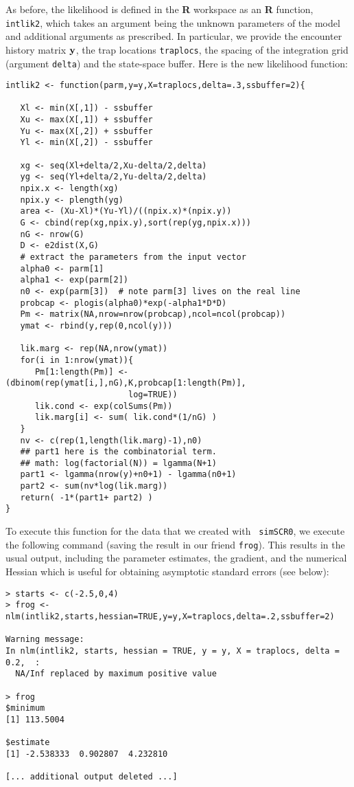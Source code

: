 As before, the likelihood is defined in the {\bf R} workspace as an
{\bf R} function, \mbox{\tt intlik2}, which takes an argument being
the unknown parameters of the model and additional arguments as
prescribed. In particular, we provide the encounter history matrix
${\bf y}$, the trap locations \mbox{\tt traplocs}, the spacing of the
integration grid (argument \mbox{\tt delta}) and the state-space
buffer. Here is the new likelihood function: {\small
\begin{verbatim}
intlik2 <- function(parm,y=y,X=traplocs,delta=.3,ssbuffer=2){

   Xl <- min(X[,1]) - ssbuffer
   Xu <- max(X[,1]) + ssbuffer
   Yu <- max(X[,2]) + ssbuffer
   Yl <- min(X[,2]) - ssbuffer

   xg <- seq(Xl+delta/2,Xu-delta/2,delta) 
   yg <- seq(Yl+delta/2,Yu-delta/2,delta) 
   npix.x <- length(xg)
   npix.y <- plength(yg)
   area <- (Xu-Xl)*(Yu-Yl)/((npix.x)*(npix.y))
   G <- cbind(rep(xg,npix.y),sort(rep(yg,npix.x)))
   nG <- nrow(G)
   D <- e2dist(X,G) 
   # extract the parameters from the input vector
   alpha0 <- parm[1]
   alpha1 <- exp(parm[2])
   n0 <- exp(parm[3])  # note parm[3] lives on the real line
   probcap <- plogis(alpha0)*exp(-alpha1*D*D)
   Pm <- matrix(NA,nrow=nrow(probcap),ncol=ncol(probcap))
   ymat <- rbind(y,rep(0,ncol(y)))

   lik.marg <- rep(NA,nrow(ymat))
   for(i in 1:nrow(ymat)){
      Pm[1:length(Pm)] <- (dbinom(rep(ymat[i,],nG),K,probcap[1:length(Pm)],
                         log=TRUE))
      lik.cond <- exp(colSums(Pm))
      lik.marg[i] <- sum( lik.cond*(1/nG) )  
   }                                                 
   nv <- c(rep(1,length(lik.marg)-1),n0)
   ## part1 here is the combinatorial term. 
   ## math: log(factorial(N)) = lgamma(N+1)
   part1 <- lgamma(nrow(y)+n0+1) - lgamma(n0+1)
   part2 <- sum(nv*log(lik.marg))
   return( -1*(part1+ part2) )
}
\end{verbatim}
} 
To execute this function for the data that we created with \mbox{\tt
  simSCR0}, we execute the following command (saving the result in our
friend \mbox{\tt frog}).  This results in the usual output, including
the parameter estimates, the gradient, and the numerical Hessian which
is useful for obtaining asymptotic standard errors (see below):
\begin{verbatim}
> starts <- c(-2.5,0,4)
> frog <- nlm(intlik2,starts,hessian=TRUE,y=y,X=traplocs,delta=.2,ssbuffer=2)

Warning message:
In nlm(intlik2, starts, hessian = TRUE, y = y, X = traplocs, delta = 0.2,  :
  NA/Inf replaced by maximum positive value

> frog
$minimum
[1] 113.5004

$estimate
[1] -2.538333  0.902807  4.232810

[... additional output deleted ...]
\end{verbatim}
